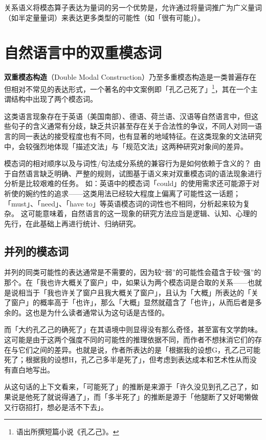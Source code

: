 \documentclass[fontset=ubuntu]{ctexart}
\newcommand{\textul}[1]{\makebox{\underline{#1}}}
\begin{document}
			关系语义将模态算子表达为量词的另一个优势是，允许通过将量词推广为广义量词（如半定量量词）来表达更多类型的可能性（如「很有可能」）。

		\section{自然语言中的双重模态词}
			
			\textbf{双重模态构造}（Double Modal Construction）乃至多重模态构造是一类普遍存在但相对不常见的表达形式，一个著名的中文案例即「\textul{大约}孔乙己\textul{的确}死了」\footnote{语出\citet{魯迅1923吶喊}所撰短篇小说《孔乙己》。}，其在一个主谓结构中出现了两个模态词。

			这类语言现象存在于英语（美国南部）、德语、荷兰语、汉语等自然语言中，但这些句子的含义通常有分歧，缺乏共识甚至存在关于合法性的争议，不同人对同一语言的同一表达的接受程度也有不同，也有显著的地域特征。在这类现象的文法研究中，会较强烈地体现「描述文法」与「规范文法」这两种研究对象间的差异。
			
			模态词的相对顺序以及与词性/句法成分系统的兼容行为是如何依赖于含义的？
			由于自然语言缺乏明确、严整的规则，试图基于语义来对双重模态词的语法现象进行分析是比较艰难的任务。
			如：英语中的模态词「could」的使用需求还可能源于对祈使的婉约性的追求——这类用法已经较大程度上偏离了可能性这一话题；「must」、「need」、「have to」等英语模态词的词性也不相同，分析起来较为复杂。
			这可能意味着，自然语言的这一现象的研究方法应当是逻辑、认知、心理的先行，在此基础上再进行统计、归纳研究。

			\subsection{并列的模态词}

				并列的同类可能性的表达通常是不需要的，因为较“弱”的可能性会蕴含于较“强”的那个。在「我也许大概关了窗户」中，如果认为两个模态词是合取的关系——也就是说相当于「我也许关了窗户且我大概关了窗户」，且认为「大概」所表达的「关了窗户」的概率高于「也许」，那么「大概」显然就蕴含了「也许」，从而后者是多余的。这也是为什么读者通常认为这句话是古怪的。

				而「大约孔乙己的确死了」在其语境中则显得没有那么奇怪，甚至富有文学韵味。这可能是由于这两个强度不同的可能性的推理依据不同，而作者不想抹消它们的存在与它们之间的差异。也就是说，作者所表达的是「根据我的设想G，孔乙己可能死了；根据我的设想H，孔乙己多半是死了」，但考虑到表达成本和艺术性从而没有直白地写出。

				从这句话的上下文看来，「可能死了」的推断是来源于「许久没见到孔乙己了，如果说是他死了就说得通了」，而「多半死了」的推断是源于「他腿断了又好喝懒做又行窃招打，想必是活不下去」。
				
\end{document}

